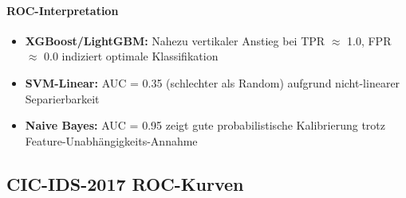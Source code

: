 \documentclass[11pt,a4paper]{article}
\begin{document}
    \paragraph{ROC-Interpretation}
    \begin{itemize}
        \item \textbf{XGBoost/LightGBM:} Nahezu vertikaler Anstieg bei TPR $\approx$ 1.0,
        FPR $\approx$ 0.0 indiziert optimale Klassifikation
        \item \textbf{SVM-Linear:} AUC = 0.35 (schlechter als Random) aufgrund
        nicht-linearer Separierbarkeit
        \item \textbf{Naive Bayes:} AUC = 0.95 zeigt gute probabilistische Kalibrierung
        trotz Feature-Unabhängigkeits-Annahme
    \end{itemize}

    \subsection{CIC-IDS-2017 ROC-Kurven}
    \label{app:cic_roc}
\end{document}
